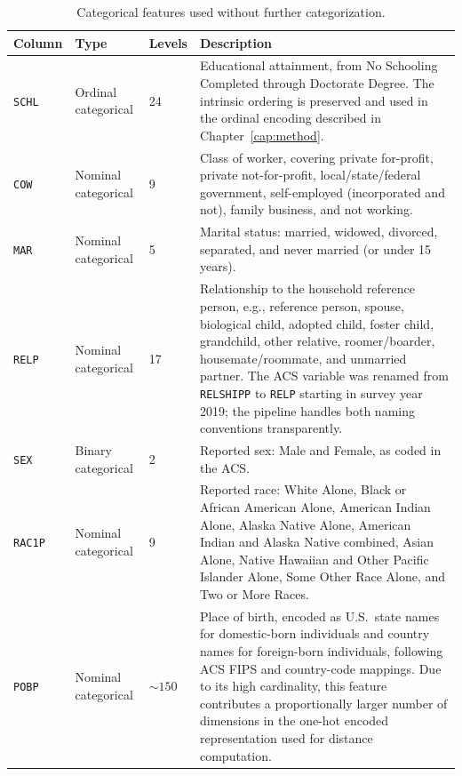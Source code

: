 \begin{table}[htbp]
\centering
\renewcommand{\arraystretch}{1.2}
\caption{Categorical features used without further categorization.}
\label{tab:remaining-features}
\begin{tabular}{>{\raggedright\arraybackslash}p{} >{\raggedright\arraybackslash}p{} p{} p{}}
  \toprule
  \textbf{Column} & \textbf{Type} & \textbf{Levels} & \textbf{Description} \\
  \midrule
  \texttt{SCHL} & Ordinal categorical & 24 & Educational attainment, from No Schooling Completed through Doctorate Degree. The intrinsic ordering is preserved and used in the ordinal encoding described in Chapter~\ref{cap:method}. \\
  \texttt{COW} & Nominal categorical & 9 & Class of worker, covering private for-profit, private not-for-profit, local/state/federal government, self-employed (incorporated and not), family business, and not working. \\
  \texttt{MAR} & Nominal categorical & 5 & Marital status: married, widowed, divorced, separated, and never married (or under 15 years). \\
  \texttt{RELP} & Nominal categorical & 17 & Relationship to the household reference person, e.g., reference person, spouse, biological child, adopted child, foster child, grandchild, other relative, roomer/boarder, housemate/roommate, and unmarried partner. The ACS variable was renamed from \texttt{RELSHIPP} to \texttt{RELP} starting in survey year 2019; the pipeline handles both naming conventions transparently. \\
  \texttt{SEX} & Binary categorical & 2 & Reported sex: Male and Female, as coded in the ACS. \\
  \texttt{RAC1P} & Nominal categorical & 9 & Reported race: White Alone, Black or African American Alone, American Indian Alone, Alaska Native Alone, American Indian and Alaska Native combined, Asian Alone, Native Hawaiian and Other Pacific Islander Alone, Some Other Race Alone, and Two or More Races. \\
  \texttt{POBP} & Nominal categorical & ${\sim}150$ & Place of birth, encoded as U.S.\ state names for domestic-born individuals and country names for foreign-born individuals, following ACS FIPS and country-code mappings. Due to its high cardinality, this feature contributes a proportionally larger number of dimensions in the one-hot encoded representation used for distance computation. \\
  \bottomrule
\end{tabular}
\renewcommand{\arraystretch}{1.0}
\end{table}

